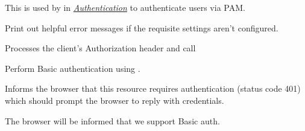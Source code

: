 \documentclass[letterpaper,10pt,openany]{sphinxmanual}
\begin{document}
\begin{fulllineitems}
\label{Developer/pam:gateone.auth.pam.PAMAuthMixin}
This is used by  in {\hyperref[Developer/authentication:auth-py]{\emph{Authentication}}} to authenticate users via
PAM.

\begin{fulllineitems}
\label{Developer/pam:gateone.auth.pam.PAMAuthMixin.initialize}
Print out helpful error messages if the requisite settings aren't
configured.

\end{fulllineitems}


\begin{fulllineitems}
\label{Developer/pam:gateone.auth.pam.PAMAuthMixin.get_authenticated_user}
Processes the client's Authorization header and call

\end{fulllineitems}


\begin{fulllineitems}
\label{Developer/pam:gateone.auth.pam.PAMAuthMixin.auth_basic}
Perform Basic authentication using .

\end{fulllineitems}


\begin{fulllineitems}
\label{Developer/pam:gateone.auth.pam.PAMAuthMixin.authenticate_redirect}
Informs the browser that this resource requires authentication (status
code 401) which should prompt the browser to reply with credentials.

The browser will be informed that we support Basic auth.

\end{fulllineitems}


\end{fulllineitems}
\end{document}
